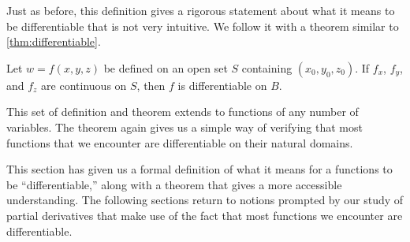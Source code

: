 Just as before, this definition gives a rigorous statement about what it means to be differentiable that is not very intuitive. We follow it with a theorem similar to \autoref{thm:differentiable}.


{Let $w=f(x,y,z)$ be defined on an open set $S$ containing $(x_0,y_0,z_0)$. If $f_x$, $f_y$, and $f_z$ are continuous on $S$, then $f$ is differentiable on $B$.
}

This set of definition and theorem extends to functions of any number of variables. The theorem again gives us a simple way of verifying that most functions that we encounter are differentiable on their natural domains.\bigskip

This section has given us a formal definition of what it means for a functions to be ``differentiable,'' along with a theorem that gives a more accessible understanding. The following sections return to notions prompted by our study of partial derivatives that make use of the fact that most functions we encounter are differentiable.

